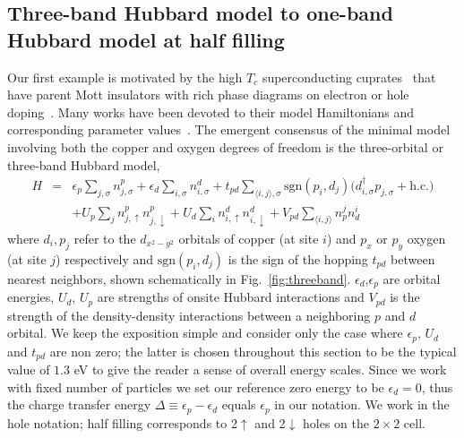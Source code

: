 \subsection{Three-band Hubbard model to one-band Hubbard model at half filling}
\label{subsection:3band} 
Our first example is motivated by the high $T_c$ superconducting cuprates~\cite{Bednorz1986} that 
have parent Mott insulators with rich phase diagrams on electron or hole doping~\cite{Dagotto_RevModPhys, LeeWen_RevModPhys}. 
Many works have been devoted to their model Hamiltonians and corresponding parameter 
values~\cite{tJSpalek, Pavirini, Emery, ZhangRice, Hybertsen_PRB1989, Hybertsen_PRB1990, Kent_Hubbard}. 
The emergent consensus of the minimal model involving both the copper and oxygen degrees of freedom 
is the three-orbital or three-band Hubbard model, 
\begin{eqnarray}
H &=&    \epsilon_p \sum_{j,\sigma} n^{p}_{j,\sigma} + \epsilon_{d} \sum_{i,\sigma}  n^{d}_{i,\sigma} 
	+ t_{pd} \sum_{\langle i,j \rangle, \sigma} \text{sgn}(p_i,d_j) \Big( d_{i,\sigma}^{\dagger} p_{j,\sigma} + \text{h.c.} \Big) \nonumber \\
  & &   + U_p \sum_{j} n^{p}_{j,\uparrow} n^{p}_{j,\downarrow} + U_d \sum_{i} n^{d}_{i,\uparrow} n^{d}_{i,\downarrow} + V_{pd} \sum_{\langle i,j \rangle} n^{j}_p n^{i}_d 
\end{eqnarray}
where $d_i,p_j$ refer to the  $d_{x^2 - y^2}$ orbitals of copper (at site $i$) and $p_x$ or $p_y$ 
oxygen (at site $j$)  respectively and $\text{sgn}(p_i,d_j)$ is the sign of the hopping $t_{pd}$ 
between nearest neighbors, shown schematically in Fig.~\ref{fig:threeband}. 
$\epsilon_d$,$\epsilon_p$ are orbital energies, $U_d$, $U_p$ are strengths of onsite Hubbard interactions 
and $V_{pd}$ is the strength of the density-density interactions between a neighboring $p$ and $d$ orbital. 
We keep the exposition simple and consider only the case where $\epsilon_p$, $U_d$ and $t_{pd}$ 
are non zero; the latter is chosen throughout this section to be the typical value of $1.3$ eV to give the reader a sense of overall energy 
scales. Since we work with fixed number of particles we set our reference zero energy 
to be $\epsilon_d = 0$, thus the charge transfer energy $\Delta \equiv \epsilon_p - \epsilon_d$ equals $\epsilon_p$ in our notation. 
We work in the hole notation; half filling corresponds to 2$\uparrow$ and 2$\downarrow$ holes on the $2\times2$ cell.

